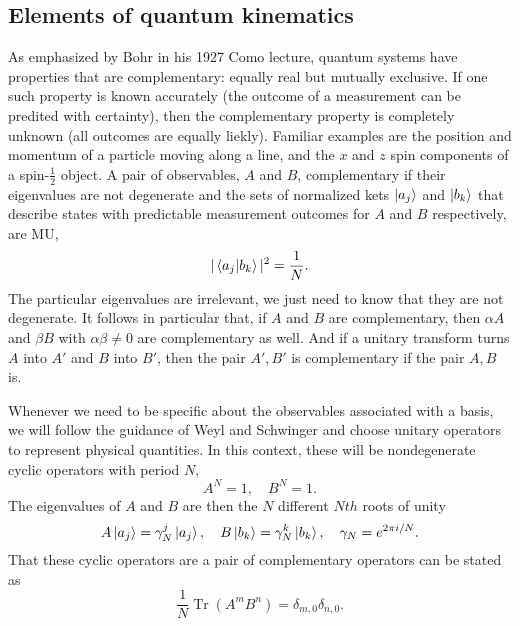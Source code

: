 \documentclass[a4paper]{article}
\DeclareMathOperator{\Tr}{Tr}
\begin{document}
  \subsection{Elements of quantum kinematics}

  As emphasized by Bohr in his 1927 Como lecture, quantum
  systems have properties that are complementary: equally
  real but mutually exclusive. If one such property is known
  accurately (the outcome of a measurement can be predited
  with certainty), then the complementary property is completely
  unknown (all outcomes are equally liekly).  Familiar
  examples are the position and momentum of a particle
  moving along a line, and the $x$ and $z$ spin components
  of a spin-$\frac{1}{2}$ object. A pair of observables, $A$ 
  and $B$, complementary if their eigenvalues are not
  degenerate and the sets of normalized kets $\ket{a_j}$ and
  $\ket{b_k}$ that describe states with predictable
  measurement outcomes for $A$ and $B$ respectively, are MU,
  \[
    |\braket{a_j|b_k}|^2 = \frac{1}{N}.
  \] 
  The particular eigenvalues are irrelevant, we just need to
  know that they are not degenerate. It follows in
  particular that, if $A$ and $B$ are complementary, then
  $\alpha A$ and $\beta B$ with $\alpha \beta \neq 0$ are
  complementary as well. And if a unitary transform turns
  $A$ into $A'$ and $B$ into $B'$, then the pair $A',B'$ is
  complementary if the pair $A,B$ is.

  Whenever we need to be specific about the observables
  associated with a basis, we will follow the guidance of
  Weyl and Schwinger and choose unitary operators to
  represent physical quantities. In this context, these will
  be nondegenerate cyclic operators with period $N$,
  \[
    A^{N} = 1,
    \quad
    B^{N} = 1.
  \] 
  The eigenvalues of $A$ and $B$ are then the $N$ different
  $Nth$ roots of unity
  \[
    A\ket{a_j} = \gamma_N^j \ket{a_j},
    \quad
    B\ket{b_k} = \gamma_N^k \ket{b_k},
    \quad
    \gamma_N = e^{2\pi i / N}.
  \] 
  That these cyclic operators are a pair of complementary
  operators can be stated as
  \[
    \frac{1}{N} \Tr(A^{m}B^{n}) = \delta_{m,0}\delta_{n,0}.
  \] 
  
\end{document}

